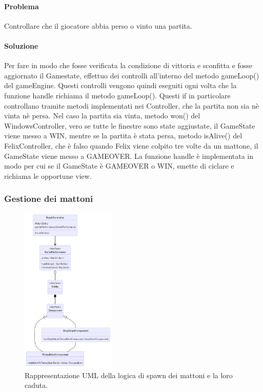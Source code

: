 \documentclass[a4paper,12pt]{report}
\begin{document}
\paragraph{Problema} Controllare che il giocatore abbia perso o vinto una partita.

\paragraph{Soluzione} Per fare in modo che fosse verificata la condizione di vittoria e sconfitta e fosse aggiornato il Gamestate, effettuo dei controlli all'interno del metodo gameLoop() del gameEngine. Questi controlli vengono quindi eseguiti ogni volta che la funzione handle richiama il metodo gameLoop(). Questi if in particolare controllano tramite metodi implementati nei Controller, che la partita non sia nè vinta nè persa. Nel caso la partita sia vinta, metodo won() del WindowsController, vero se tutte le finestre sono state aggiustate, il GameState viene messo a WIN, mentre se la partita è stata persa, metodo isAlive() del FelixController, che è falso quando Felix viene colpito tre volte da un mattone, il GameState viene messo a GAMEOVER. La funzione handle è implementata in modo per cui se il GameState è GAMEOVER o WIN, smette di ciclare e richiama le opportune view. 

\subsubsection{Gestione dei mattoni}

\begin{figure}[H]
\centering{}
\includegraphics[width=0.4\textwidth]{img/Mattoni.png}
\caption{Rappresentazione UML della logica di spawn dei mattoni e la loro caduta.}
\end{figure}
\end{document}
